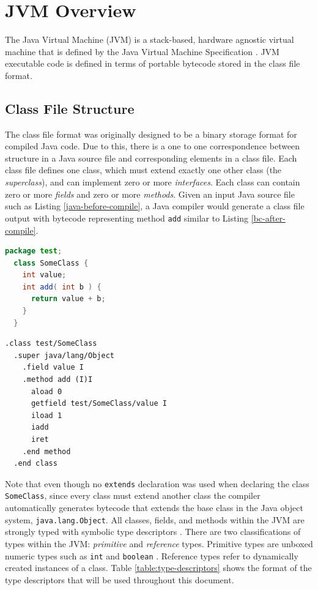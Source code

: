 \chapter{JVM Overview}
\label{chapter:JVM}
\lhead{ \leftmark }

The Java Virtual Machine (JVM) is a stack-based, hardware agnostic virtual machine that is defined by the Java Virtual Machine Specification \cite{jvms7}.  JVM executable code is defined in terms of portable bytecode \cite[4.10]{jvms7} stored in the class file format.

\section{Class File Structure}

The class file format was originally designed to be a binary storage format for compiled Java code.  Due to this, there is a one to one correspondence between structure in a Java source file and corresponding elements in a class file.  Each class file defines one class, which must extend exactly one other class (the \emph{superclass}), and can implement zero or more \emph{interfaces}.  Each class can contain zero or more \emph{fields} and zero or more \emph{methods}.  Given an input Java source file such as Listing \ref{java-before-compile}, a Java compiler would generate a class file output with bytecode representing method \texttt{add} similar to Listing \ref{bc-after-compile}.

\smallskip

\begin{lstlisting}[language=Java,caption=Java before compilation,label=java-before-compile]
  package test;
  class SomeClass {
    int value;
    int add( int b ) {
      return value + b;
    }
  }
\end{lstlisting}

\smallskip

\begin{lstlisting}[language=jvm-bytecode,caption=Mnemonic pseudocode describing the binary structure of class files,label=bc-after-compile]
  .class test/SomeClass
  .super java/lang/Object
    .field value I
    .method add (I)I 
      aload 0
      getfield test/SomeClass/value I
      iload 1
      iadd
      iret
    .end method
  .end class
\end{lstlisting}

Note that even though no \texttt{extends} declaration was used when declaring the class \texttt{SomeClass}, since every class must extend another class the compiler automatically generates bytecode that extends the base class in the Java object system, \texttt{java.lang.Object}.  All classes, fields, and methods within the JVM are strongly typed with symbolic type descriptors \cite[4.3]{jvms7}.  There are two classifications of types within the JVM: \emph{primitive} and \emph{reference} types.  Primitive types are unboxed numeric types such as \texttt{int} and \texttt{boolean} \cite[2.3]{jvms7}.  Reference types refer to dynamically created instances of a class.  Table \ref{table:type-descriptors} shows the format of the type descriptors that will be used throughout this document.

